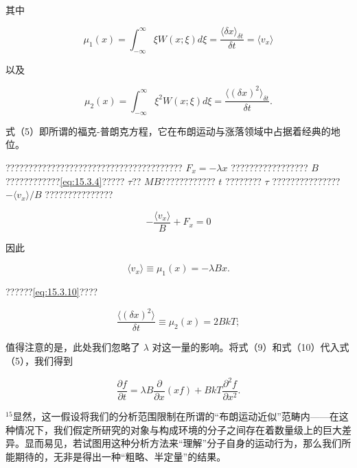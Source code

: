 其中

\begin{equation}\tag{15.4.6}\label{eq:15.4.6}
\mu _ { 1 } ( x ) = \int _ { - \infty } ^{\infty} \xi W ( x ; \xi ) d \xi = \frac { \langle \delta x \rangle _ { \delta t } } { \delta t } = \langle v _ { x } \rangle
\end{equation}

以及

\begin{equation}\tag{15.4.7}\label{eq:15.4.7}
\mu _ { 2 } ( x ) = \int _ { - \infty } ^{\infty} \xi ^{2} W ( x ; \xi ) d \xi = \frac { \langle ( \delta x ) ^{2} \rangle _ { \delta t } } { \delta t } .
\end{equation}

式（5）即所谓的福克-普朗克方程，它在布朗运动与涨落领域中占据着经典的地位。

??????????????????????????????????????? \(F_{x} = -\lambda x\) ????????????????? \(B\)????????????\autoref{eq:15.3.4}????? \(\tau\)?? \(MB\)???????????? \(t\) ???????? \(\tau\) ??????????????? \(-\langle v_{x}\rangle/B\) ???????????????

\begin{equation}\tag{15.4.8}\label{eq:15.4.8}
- \frac { \langle v _ { x } \rangle } { B } + F _ { x } = 0
\end{equation}

因此

\begin{equation}\tag{15.4.9}\label{eq:15.4.9}
\langle v _ { x } \rangle \equiv \mu _ { 1 } ( x ) = - \lambda B x .
\end{equation}

??????\autoref{eq:15.3.10}????

\begin{equation}\tag{15.4.10}\label{eq:15.4.10}
\frac { \langle ( \delta x ) ^{2} \rangle } { \delta t } \equiv \mu _ { 2 } ( x ) = 2 B k T ;
\end{equation}

值得注意的是，此处我们忽略了 \(\lambda\) 对这一量的影响。将式（9）和式（10）代入式（5），我们得到

\begin{equation}\tag{15.4.11}\label{eq:15.4.11}
\frac { \partial f } { \partial t } = \lambda B \frac { \partial } { \partial x } ( x f ) + B k T \frac { \partial ^{2} f } { \partial x ^{2} } .
\end{equation}

\(^{15}\)显然，这一假设将我们的分析范围限制在所谓的``布朗运动近似''范畴内------在这种情况下，我们假定所研究的对象与构成环境的分子之间存在着数量级上的巨大差异。显而易见，若试图用这种分析方法来``理解''分子自身的运动行为，那么我们所能期待的，无非是得出一种``粗略、半定量''的结果。

